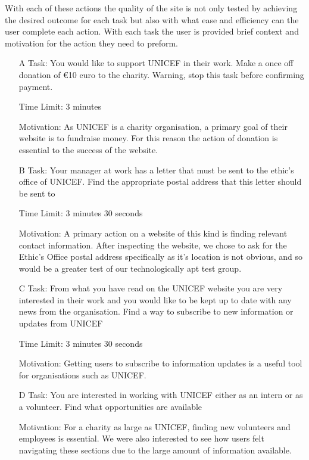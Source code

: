   With each of these actions the quality of the site is not only tested by achieving the desired outcome for each task but also with what ease and efficiency can the user complete each action. 
  With each task the user is provided brief context and motivation for the action they need to preform. 

\begin{itemize}
    \item [A] Task: You would like to support UNICEF in their work. Make a once off donation of €10 euro to the charity. Warning, stop this task before confirming payment.

    \item [] Time Limit: 3 minutes

    \item [] Motivation: As UNICEF is a charity organisation, a primary goal of their website is to fundraise money. For this reason the action of donation is essential to the success of the website. 

    \item[B] Task: Your manager at work has a letter that must be sent to the ethic’s office of UNICEF. Find the appropriate postal address that this letter should be sent to
    
    \item [] Time Limit: 3 minutes 30 seconds

    \item[] Motivation: A primary action on a website of this kind is finding relevant contact information. After inspecting the website, we chose to ask for the Ethic’s Office postal address specifically as it’s location is not obvious, and so would be a greater test of our technologically apt test group. 

    \item[C] Task: From what you have read on the UNICEF website you are very interested in their work and you would like to be kept up to date with any news from the organisation. Find a way to subscribe to new information or updates from UNICEF

    \item [] Time Limit: 3 minutes 30 seconds

    \item[] Motivation: Getting users to subscribe to information updates is a useful tool for organisations such as UNICEF.
    
    \item[D] Task: You are interested in working with UNICEF either as an intern or as a volunteer. Find what opportunities are available
    \item[] Motivation: For a charity as large as UNICEF, finding new volunteers and employees is essential. We were also interested to see how users felt navigating these sections due to the large amount of information available. 


\end{itemize}
